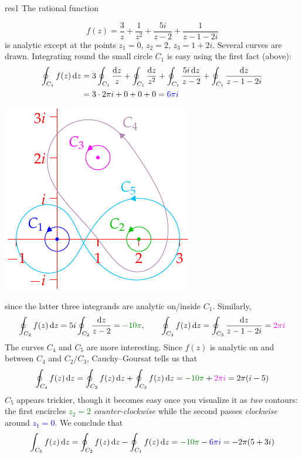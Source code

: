 \begin{example}{}{res1}
	The rational function\par
	\begin{minipage}[t]{0.67\linewidth}\vspace{-10pt}
		\[
			f(z)=\frac 3{z}+\frac 1{z^2}+\frac{5i}{z-2}+\frac 1{z-1-2i}
		\]
		is analytic except at the points $z_1=0$, $z_2=2$, $z_3=1+2i$.\smallbreak
		Several curves are drawn. Integrating round the small circle $C_1$ is easy using the first fact (above):
		\begin{align*}
			\oint_{C_1}f(z)\,{\mathrm{d} z}
			&=3\oint_{C_1}\frac{{\mathrm{d} z}}z+\oint_{C_1}\frac{{\mathrm{d} z}}{z^2} +\oint_{C_1}\frac{5i\,{\mathrm{d} z}}{z-2}+\oint_{C_1}\frac{{\mathrm{d} z}}{z-1-2i}\\
			&=3\cdot 2\pi i+0+0+0
			=\textcolor{blue}{6\pi i}
		\end{align*}
	\end{minipage}
	\hfill
	\begin{minipage}[t]{0.32\linewidth}\vspace{-15pt}
		\flushright\includegraphics{res1}
	\end{minipage}\medbreak
	since the latter three integrands are analytic on/inside $C_1$. Similarly,
	\[
		\oint_{C_2}f(z)\,\dz=5i\oint_{C_2}\frac{\dz}{z-2}=\textcolor{Green}{-10\pi},\qquad
		\oint_{C_3}f(z)\,\dz = \oint_{C_3}\frac{\dz}{z-1-2i}=\textcolor{Magenta}{2\pi i}
	\]
	The curves $C_4$ and $C_5$ are more interesting. Since $f(z)$ is analytic on and between $C_4$ and $C_2/C_3$, Cauchy--Goursat tells us that
	\[
		\oint_{C_4}f(z)\,\dz
		=\oint_{C_2}f(z)\,\dz+\oint_{C_3}f(z)\,\dz
		=\textcolor{Green}{-10\pi}+\textcolor{Magenta}{2\pi i}
		=2\pi(i-5)
	\]
	$C_5$ appears trickier, though it becomes easy once you visualize it as \emph{two} contours: the first encircles \textcolor{Green}{$z_2=2$} \emph{counter-clockwise} while the second passes \emph{clockwise} around \textcolor{blue}{$z_1=0$}. We conclude that
	\[
		\int_{C_5}f(z)\,\dz
		=\oint_{C_2}f(z)\,\dz-\oint_{C_1}f(z)\,\dz
		=\textcolor{Green}{-10\pi}-\textcolor{blue}{6\pi i}
		=-2\pi(5+3i)
	\]
\end{example}

